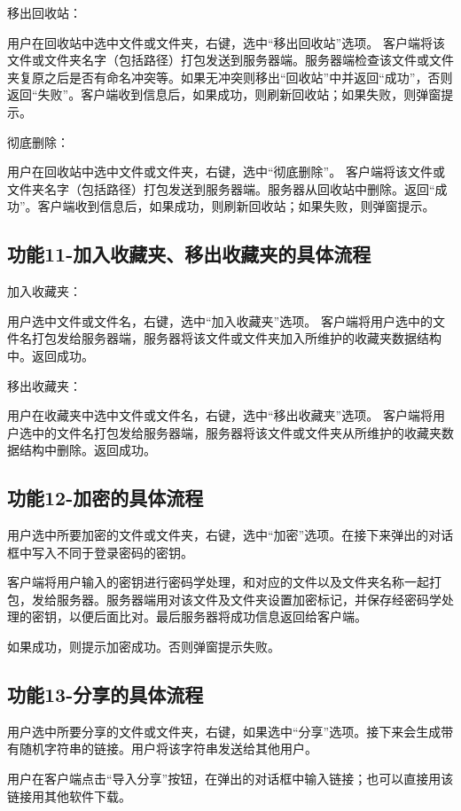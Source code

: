  
移出回收站：

用户在回收站中选中文件或文件夹，右键，选中“移出回收站”选项。
客户端将该文件或文件夹名字（包括路径）打包发送到服务器端。服务器端检查该文件或文件夹复原之后是否有命名冲突等。如果无冲突则移出“回收站”中并返回“成功”，否则返回“失败”。客户端收到信息后，如果成功，则刷新回收站；如果失败，则弹窗提示。

彻底删除：

用户在回收站中选中文件或文件夹，右键，选中“彻底删除”。
客户端将该文件或文件夹名字（包括路径）打包发送到服务器端。服务器从回收站中删除。返回“成功”。客户端收到信息后，如果成功，则刷新回收站；如果失败，则弹窗提示。


\subsection{功能11-加入收藏夹、移出收藏夹的具体流程}
加入收藏夹：

用户选中文件或文件名，右键，选中“加入收藏夹”选项。
客户端将用户选中的文件名打包发给服务器端，服务器将该文件或文件夹加入所维护的收藏夹数据结构中。返回成功。

移出收藏夹：

用户在收藏夹中选中文件或文件名，右键，选中“移出收藏夹”选项。
客户端将用户选中的文件名打包发给服务器端，服务器将该文件或文件夹从所维护的收藏夹数据结构中删除。返回成功。

\subsection{功能12-加密的具体流程}
用户选中所要加密的文件或文件夹，右键，选中“加密”选项。在接下来弹出的对话框中写入不同于登录密码的密钥。

客户端将用户输入的密钥进行密码学处理，和对应的文件以及文件夹名称一起打包，发给服务器。服务器端用对该文件及文件夹设置加密标记，并保存经密码学处理的密钥，以便后面比对。最后服务器将成功信息返回给客户端。

如果成功，则提示加密成功。否则弹窗提示失败。



\subsection{功能13-分享的具体流程}
用户选中所要分享的文件或文件夹，右键，如果选中“分享”选项。接下来会生成带有随机字符串的链接。用户将该字符串发送给其他用户。

用户在客户端点击“导入分享”按钮，在弹出的对话框中输入链接；也可以直接用该链接用其他软件下载。

